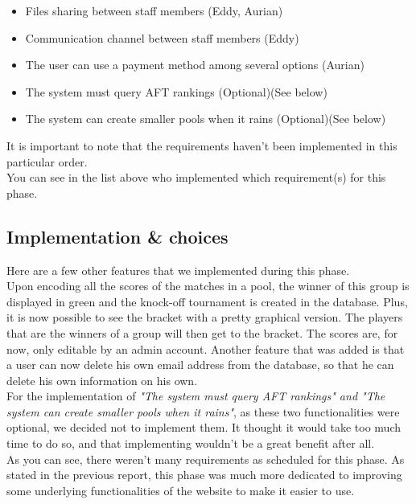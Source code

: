 \documentclass[a4paper, 12pt]{article}
\begin{document}
\begin{itemize}
 
\item Files sharing between staff members (Eddy, Aurian)
\item Communication channel between staff members (Eddy)
\item The user can use a payment method among several options (Aurian)
\item The system must query AFT rankings (Optional)(See below)
\item The system can create smaller pools when it rains (Optional)(See below)
\\
\end{itemize}

It is important to note that the requirements haven't been implemented in this particular order.\\

You can see in the list above who implemented which requirement(s) for this phase. 

\subsection{Implementation \& choices}

Here are a few other features that we implemented during this phase. \\

Upon encoding all the scores of the matches in a pool, the winner of this group is displayed in green and the knock-off tournament is created in the database. Plus, it is now possible to see the bracket with a pretty graphical version. The players that are the winners of a group will then get to the bracket. The scores are, for now, only editable by an admin account. Another feature that was added is that a user can now delete his own email address from the database, so that he can delete his own information on his own.\\

For the implementation of \textit{"The system must query AFT rankings" and "The system can create smaller pools when it rains"}, as these two functionalities were optional, we decided not to implement them. It thought it would take too much time to do so, and that implementing wouldn't be a great benefit after all.\\

As you can see, there weren't many requirements as scheduled for this phase. As stated in the previous report, this phase was much more dedicated to improving some underlying functionalities of the website to make it easier to use.
\end{document}
